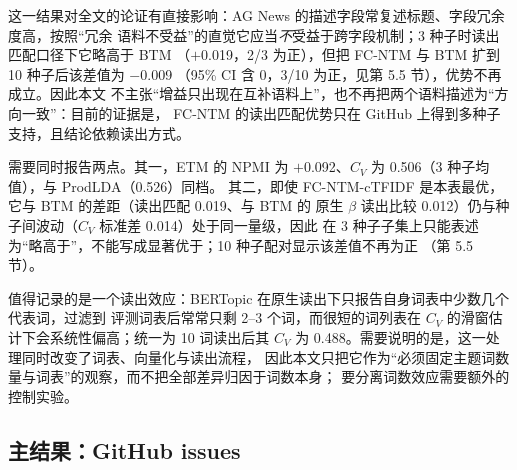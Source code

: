 \documentclass{article}
\begin{document}
这一结果对全文的论证有直接影响：AG News 的描述字段常复述标题、字段冗余度高，按照“冗余
语料不受益”的直觉它应当\emph{不}受益于跨字段机制；3 种子时读出匹配口径下它略高于 BTM
（$+$0.019，2/3 为正），但把 FC-NTM 与 BTM 扩到 10 种子后该差值为 $-$0.009
（95\% CI 含 0，3/10 为正，见第 5.5 节），优势不再成立。因此本文
不主张“增益只出现在互补语料上”，也不再把两个语料描述为“方向一致”：目前的证据是，
FC-NTM 的读出匹配优势只在 GitHub 上得到多种子支持，且结论依赖读出方式。

需要同时报告两点。其一，ETM 的 NPMI 为 $+$0.092、$C_V$ 为 0.506（3 种子均值），与
ProdLDA（0.526）同档。
其二，即使 FC-NTM-cTFIDF 是本表最优，它与 BTM 的差距（读出匹配 0.019、与 BTM 的
原生 $\beta$ 读出比较 0.012）仍与种子间波动（$C_V$ 标准差 0.014）处于同一量级，因此
在 3 种子子集上只能表述为“略高于”，不能写成显著优于；10 种子配对显示该差值不再为正
（第 5.5 节）。

值得记录的是一个读出效应：BERTopic 在原生读出下只报告自身词表中少数几个代表词，过滤到
评测词表后常常只剩 2--3 个词，而很短的词列表在 $C_V$ 的滑窗估计下会系统性偏高；统一为
10 词读出后其 $C_V$ 为 0.488。需要说明的是，这一处理同时改变了词表、向量化与读出流程，
因此本文只把它作为“必须固定主题词数量与词表”的观察，而不把全部差异归因于词数本身；
要分离词数效应需要额外的控制实验。

\subsection{主结果：GitHub issues}
\label{sec:main-github}
\end{document}
